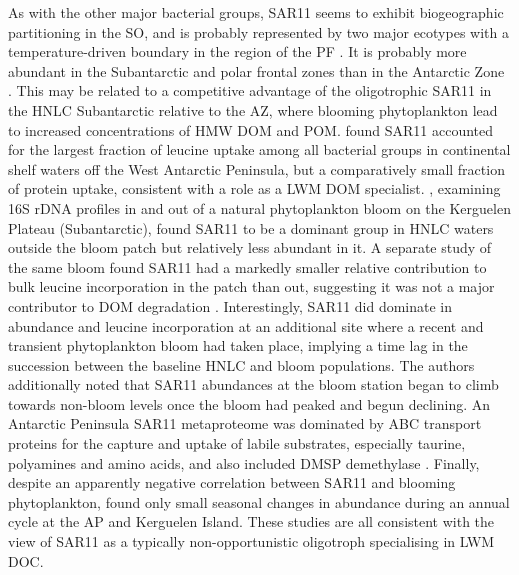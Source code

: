 As with the other major bacterial groups, SAR11 seems to exhibit biogeographic partitioning in the \ac{SO}, and is probably represented by two major ecotypes with a temperature-driven boundary in the region of the \ac{PF} \cite{Brown:2012gna}.
It is probably more abundant in the Subantarctic and polar frontal zones than in the Antarctic Zone \cite{Giebel:2009hr,Ghiglione:2011ee}.
This may be related to a competitive advantage of the oligotrophic SAR11 in the \ac{HNLC} Subantarctic relative to the \ac{AZ}, where blooming phytoplankton lead to increased concentrations of \ac{HMW} \ac{DOM} and \ac{POM}.
\citet{Straza:2010io} found SAR11 accounted for the largest fraction of leucine uptake among all bacterial groups in continental shelf waters off the West Antarctic Peninsula, but a comparatively small fraction of protein uptake, consistent with a role as a \ac{LWM} \ac{DOM} specialist.
\citet{West:2008kc}, examining 16S rDNA profiles in and out of a natural phytoplankton bloom on the Kerguelen Plateau (Subantarctic), found SAR11 to be a dominant group in \ac{HNLC} waters outside the bloom patch but relatively less abundant in it.
A separate study of the same bloom found SAR11 had a markedly smaller relative contribution to bulk leucine incorporation in the patch than out, suggesting it was not a major contributor to \ac{DOM} degradation \cite{Obernosterer:2011df}.
Interestingly, SAR11 did dominate in abundance and leucine incorporation at an additional site where a recent and transient phytoplankton bloom had taken place, implying a time lag in the succession between the baseline \ac{HNLC} and bloom populations.
The authors additionally noted that SAR11 abundances at the bloom station began to climb towards non-bloom levels once the bloom had peaked and begun declining.
An Antarctic Peninsula SAR11 metaproteome was dominated by ABC transport proteins for the capture and uptake of labile substrates, especially taurine, polyamines and amino acids, and also included \ac{DMSP} demethylase \cite{Williams:2012bs}.
Finally, despite an apparently negative correlation between SAR11 and blooming phytoplankton, \citet{Ghiglione:2011ee} found only small seasonal changes in abundance during an annual cycle at the \ac{AP} and Kerguelen Island.
These studies are all consistent with the view of SAR11 as a typically non-opportunistic oligotroph specialising in \ac{LWM} \ac{DOC}.

